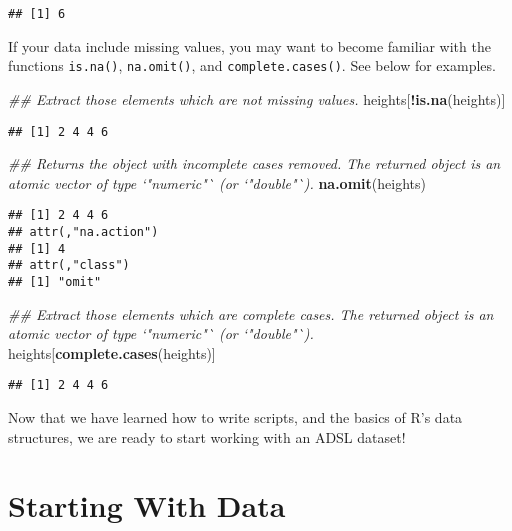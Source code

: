 \documentclass[]{book}
\newenvironment{Shaded}{\begin{snugshade}}{\end{snugshade}}
\newcommand{\CommentTok}[1]{\textcolor[rgb]{0.56,0.35,0.01}{\textit{#1}}}
\newcommand{\KeywordTok}[1]{\textcolor[rgb]{0.13,0.29,0.53}{\textbf{#1}}}
\newcommand{\NormalTok}[1]{#1}
\newcommand{\OperatorTok}[1]{\textcolor[rgb]{0.81,0.36,0.00}{\textbf{#1}}}
\begin{document}
\begin{verbatim}
## [1] 6
\end{verbatim}

If your data include missing values, you may want to become familiar with the functions \texttt{is.na()}, \texttt{na.omit()}, and \texttt{complete.cases()}. See below for examples.

\begin{Shaded}
\begin{Highlighting}[]
\CommentTok{## Extract those elements which are not missing values.}
\NormalTok{heights[}\OperatorTok{!}\KeywordTok{is.na}\NormalTok{(heights)]}
\end{Highlighting}
\end{Shaded}

\begin{verbatim}
## [1] 2 4 4 6
\end{verbatim}

\begin{Shaded}
\begin{Highlighting}[]
\CommentTok{## Returns the object with incomplete cases removed. The returned object is an atomic vector of type `"numeric"` (or `"double"`).}
\KeywordTok{na.omit}\NormalTok{(heights)}
\end{Highlighting}
\end{Shaded}

\begin{verbatim}
## [1] 2 4 4 6
## attr(,"na.action")
## [1] 4
## attr(,"class")
## [1] "omit"
\end{verbatim}

\begin{Shaded}
\begin{Highlighting}[]
\CommentTok{## Extract those elements which are complete cases. The returned object is an atomic vector of type `"numeric"` (or `"double"`).}
\NormalTok{heights[}\KeywordTok{complete.cases}\NormalTok{(heights)]}
\end{Highlighting}
\end{Shaded}

\begin{verbatim}
## [1] 2 4 4 6
\end{verbatim}

Now that we have learned how to write scripts, and the basics of R's data structures, we are ready to start working with an ADSL dataset!

\hypertarget{starting-with-data}{%
\chapter{Starting With Data}\label{starting-with-data}}
\end{document}
